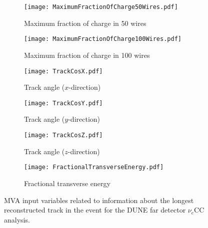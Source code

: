 \begin{figure}\ContinuedFloat
  \centering
  \begin{subfigure}[t]{0.4\linewidth}
    \centering
    \texttt{[image: MaximumFractionOfCharge50Wires.pdf]}
    \caption{Maximum fraction of charge in 50 wires}
  \end{subfigure}
  \begin{subfigure}[t]{0.4\linewidth}
    \centering
    \texttt{[image: MaximumFractionOfCharge100Wires.pdf]}
    \caption{Maximum fraction of charge in 100 wires}
  \end{subfigure}
  \begin{subfigure}[t]{0.4\linewidth}
    \centering
    \texttt{[image: TrackCosX.pdf]}
    \caption{Track angle ($x$-direction)}
  \end{subfigure}
  \begin{subfigure}[t]{0.4\linewidth}
    \centering
    \texttt{[image: TrackCosY.pdf]}
    \caption{Track angle ($y$-direction)}
  \end{subfigure}
  \begin{subfigure}[t]{0.4\linewidth}
    \centering
    \texttt{[image: TrackCosZ.pdf]}
    \caption{Track angle ($z$-direction)}
  \end{subfigure}
  \begin{subfigure}[t]{0.4\linewidth}
    \centering
    \texttt{[image: FractionalTransverseEnergy.pdf]}
    \caption{Fractional transverse energy}
  \end{subfigure}
  \caption[]{MVA input variables related to information about the longest reconstructed track in the event for the DUNE far detector $\nu_e$CC analysis.}
  \label{fig:FDMVATrackVariables}
\end{figure}

